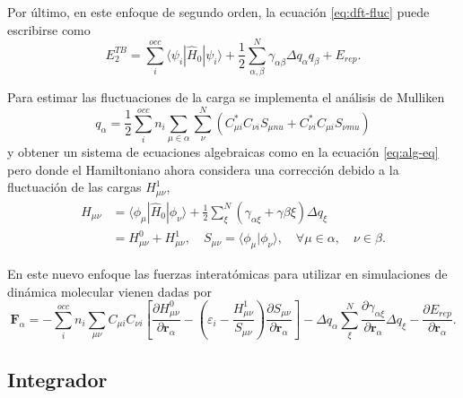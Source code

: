 \begin{enumerate}
        Por último, en este enfoque de segundo orden, la ecuación \ref{eq:dft-fluc}
        puede escribirse como
        $$
        E_2^{TB} = \sum_i^{occ} \langle \psi_i | \hat{H}_0 | \psi_i \rangle + \frac{1}{2} \sum_{\alpha, \beta}^N \gamma_{\alpha\beta} \Delta q_{\alpha} q_{\beta} + E_{rep}.
        $$

        Para estimar las fluctuaciones de la carga se implementa el análisis de
        Mulliken
        $$
        q_{\alpha} = \frac{1}{2} \sum_i^{occ} n_i \sum_{\mu \in \alpha} \sum_{\nu}^N (C_{\mu i}^{*} C_{\nu i} S_{\mu nu} + C_{\nu i}^{*} C_{\mu i} S_{\nu mu})
        $$
        y obtener un sistema de ecuaciones algebraicas como en la ecuación
        \ref{eq:alg-eq} pero donde el Hamiltoniano ahora considera una 
        corrección debido a la fluctuación de las cargas $H_{\mu \nu}^1$,
        \begin{equation*}
            \begin{aligned}
                H_{\mu \nu} &= \langle \phi_{\mu} | \hat{H}_0 | \phi_{\nu} \rangle + \frac{1}{2}\sum_{\xi}^N (\gamma_{\alpha\xi} + \gamma{\beta\xi}) \Delta q_{\xi} \\
                &= H_{\mu\nu}^0 + H_{\mu\nu}^1, \quad S_{\mu\nu} = \langle \phi_{\mu} | \phi_{\nu} \rangle, \quad \forall \mu \in \alpha, \quad \nu \in \beta.
            \end{aligned}
        \end{equation*}

        En este nuevo enfoque las fuerzas interatómicas para utilizar en 
        simulaciones de dinámica molecular vienen dadas por
        $$
        \mathbf{F}_{\alpha} = - \sum_i^{occ} n_i \sum_{\mu\nu} C_{\mu i} C_{\nu i} \left[\frac{\partial H_{\mu\nu}^0}{\partial \mathbf{r}_{\alpha}} - \left(\varepsilon_i - \frac{H_{\mu\nu}^1}{S_{\mu\nu}}\right) \frac{\partial S_{\mu\nu}}{\partial \mathbf{r}_{\alpha}} \right] - \Delta q_{\alpha} \sum_{\xi}^N \frac{\partial \gamma_{\alpha\xi}}{\partial \mathbf{r}_{\alpha}} \Delta q_{\xi} - \frac{\partial E_{rep}}{\partial \mathbf{r}_{\alpha}}.
        $$
 
\end{enumerate}

\subsection{Integrador}

